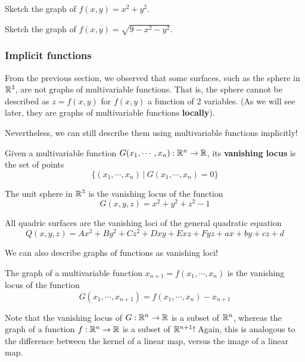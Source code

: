 


\begin{example}
Sketch the graph of $f(x,y) = x^2 + y^2$.
\end{example}

\begin{example}
Sketch the graph of $f(x,y) = \sqrt{9-x^2 - y^2}$.
\end{example}



\subsubsection{Implicit functions}

From the previous section, we observed that some surfaces, such as the sphere in $\mathbb{R}^3$, are not graphs of multivariable functions.  That is, the sphere cannot be described as $z = f(x,y)$ for $f(x,y)$ a function of 2 variables. (As we will see later, they are graphs of multivariable functions \textbf{locally}).

Nevertheless, we can still describe them using multivariable functions implicitly!

\begin{definition}
Given a multivariable function $G(x_1, \cdots, x_n) : \mathbb{R}^n \to \mathbb{R}$, its \textbf{vanishing locus} is the set of points 
$$\{(x_1, \cdots, x_n) \ | \ G(x_1, \cdots, x_n) = 0\}$$
\end{definition}


\begin{example}
The unit sphere in $\mathbb{R}^3$ is the vanishing locus of the function $$G(x,y,z) = x^2 + y^2 +z^2-1$$
\end{example}

\begin{example}
All quadric surfaces are the vanishing loci of the general quadratic equation $$Q(x,y,z) = Ax^2 + By^2 + Cz^2 + Dxy + Exz + Fyz + ax + by + cz + d$$
\end{example}

We can also describe graphs of functions as vanishing loci!

\begin{example}
The graph of a multivariable function $x_{n+1}=f(x_1, \cdots, x_n)$ is the vanishing locus of the function $$G(x_1, \cdots, x_{n+1}) = f(x_1, \cdots, x_n) -x_{n+1}$$
\end{example}

Note that the vanishing locus of $G : \mathbb{R}^n \to \mathbb{R}$ is a subset of $\mathbb{R}^n$, whereas the graph of a function $f : \mathbb{R}^n \to \mathbb{R}$ is a subset of $\mathbb{R}^{n+1}$!  Again, this is analogous to the difference between the kernel of a linear map, versus the image of a linear map.







